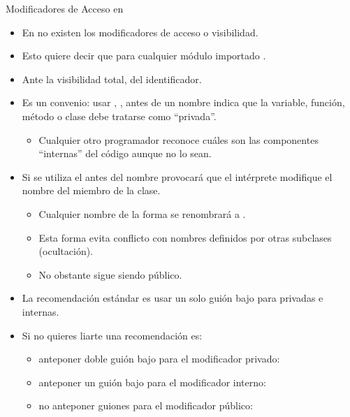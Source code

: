 \documentclass[10pt,envcountsect,spanish]{beamer}
\begin{document}




\begin{frame}{Modificadores de Acceso en } 
\begin{itemize}
\item En  no existen los modificadores de acceso o visibilidad. 
\item Esto quiere decir que para cualquier módulo importado .
\item Ante la visibilidad total,  del identificador.
\item Es un convenio: usar , \cm{\_}, antes de un nombre indica que la variable, función, método o clase  debe tratarse como ``privada''. 
\begin{itemize}
\item Cualquier otro programador reconoce cuáles son las componentes  ``internas'' del código aunque no lo sean.
\end{itemize}
\item Si se utiliza el  antes del nombre provocará que el intérprete modifique el nombre del miembro de la clase. 
	\begin{itemize}
	\item Cualquier nombre de la forma  se renombrará a . 
	\item Esta forma evita conflicto con nombres definidos por otras subclases (ocultación). 
	\item No obstante  sigue siendo público.
	\end{itemize}
\item La recomendación estándar es usar un solo guión bajo para privadas e internas.
\item Si no quieres liarte una recomendación es:
\begin{itemize}
\item anteponer doble guión bajo para el modificador privado: 
\item anteponer un guión bajo para el modificador interno:  
\item no anteponer guiones para el modificador público: 
\end{itemize}
\end{itemize}

\end{frame}
\end{document}
